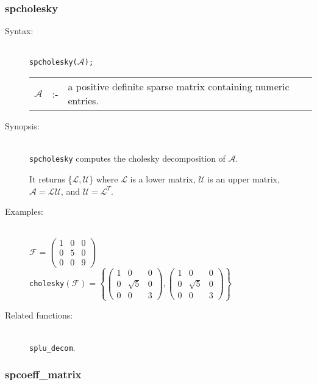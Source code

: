 \subsubsection{spcholesky}
\label{sparse:spcholesky}

\begin{description}
\item[Syntax:]\mbox{}\\
\texttt{spcholesky($\mathcal{A}$);}\\[2mm]
\begin{tabular}{l l l}
$\mathcal{A}$ &:-& a positive definite sparse matrix containing numeric entries.
\end{tabular}

\item[Synopsis:]\mbox{}\\
\texttt{spcholesky} computes the cholesky decomposition of $\mathcal{A}$.

It returns \{$\mathcal{L,U}$\} where $\mathcal{L}$
is a lower matrix, $\mathcal{U}$ is an upper matrix, \\ $\mathcal{A} =
\mathcal{LU}$, and $\mathcal{U} = \mathcal{L}^T$.

\item[Examples:]\mbox{}\\
\(\mathcal{F} = \begin{pmatrix} 1 & 0 & 0 \\ 0 & 5 & 0 \\ 0 & 0 & 9 \end{pmatrix}\) \\[2mm]
\texttt{cholesky}\((\mathcal{F})  =
\left\{
   \begin{pmatrix} 1 & 0 & 0 \\ 0 & \sqrt{5} & 0 \\ 0 & 0& 3 \end{pmatrix},
   \begin{pmatrix} 1 & 0 & 0 \\ 0 & \sqrt{5} & 0 \\ 0 & 0 & 3 \end{pmatrix}
\right\}\)

\item[Related functions:]\mbox{}\\
\texttt{splu\_decom}.
\end{description}

\subsubsection{spcoeff\_matrix}
\label{sparse:spcoeff_matrix}

